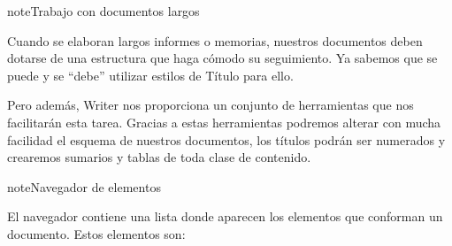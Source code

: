 \documentclass[letterpaper,10pt,spanish]{sphinxmanual}
\begin{document}
\begin{sphinxadmonition}{note}{Trabajo con documentos largos}

\sphinxAtStartPar
Cuando se elaboran largos informes o memorias, nuestros documentos deben dotarse de una estructura que haga cómodo su seguimiento. Ya sabemos que se puede y se “debe” utilizar estilos de Título para ello.

\sphinxAtStartPar
Pero además, Writer nos proporciona un conjunto de herramientas que nos facilitarán esta tarea. Gracias a estas herramientas podremos alterar con mucha facilidad el esquema de nuestros documentos, los títulos podrán ser numerados y crearemos sumarios y tablas de toda clase de contenido.
\end{sphinxadmonition}

\begin{sphinxadmonition}{note}{Navegador de elementos}

\sphinxAtStartPar
El navegador contiene una lista donde aparecen los elementos que conforman un documento. Estos elementos son:



\end{sphinxadmonition}
\end{document}

